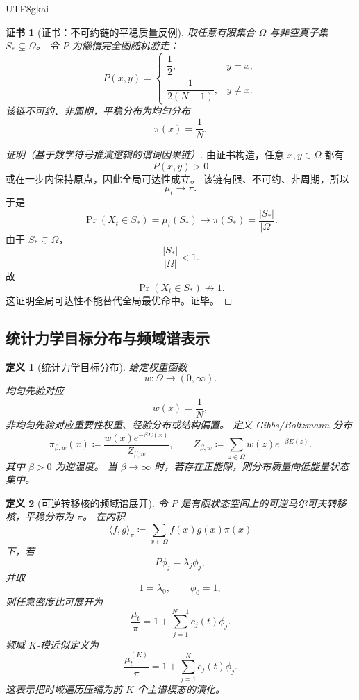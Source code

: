 \documentclass[12pt]{article}
\newtheorem{definition}{定义}[section]
\newtheorem{Certificate}{证书}[section]
\newcommand{\DefEq}{\coloneqq}
\begin{document}
\begin{CJK*}{UTF8}{gkai}
\begin{Certificate}[证书：不可约链的平稳质量反例]
\label{cert:tex55-reachable-not-hit}
取任意有限集合 \(\Omega\) 与非空真子集 \(S_*\subsetneq\Omega\)。
令 \(P\) 为懒惰完全图随机游走：
\[
  P(x,y)=
  \begin{cases}
    \dfrac12, & y=x,\\[0.6em]
    \dfrac{1}{2(N-1)}, & y\ne x.
  \end{cases}
\]
该链不可约、非周期，平稳分布为均匀分布
\[
  \pi(x)=\frac1N.
\]
\end{Certificate}

\begin{proof}[证明（基于数学符号推演逻辑的谓词因果链）]
由证书构造，任意 \(x,y\in\Omega\) 都有
\[
  P(x,y)>0
\]
或在一步内保持原点，因此全局可达性成立。
该链有限、不可约、非周期，所以
\[
  \mu_t\to\pi.
\]
于是
\[
  \Pr(X_t\in S_*)=\mu_t(S_*)\to\pi(S_*)=\frac{|S_*|}{|\Omega|}.
\]
由于 \(S_*\subsetneq\Omega\)，
\[
  \frac{|S_*|}{|\Omega|}<1.
\]
故
\[
  \Pr(X_t\in S_*)\not\to1.
\]
这证明全局可达性不能替代全局最优命中。证毕。
\end{proof}

\subsection{统计力学目标分布与频域谱表示}
\label{subsec:tex55-gibbs-spectrum}

\begin{definition}[统计力学目标分布]
\label{def:tex55-gibbs}
给定权重函数
\[
  w:\Omega\to(0,\infty).
\]
均匀先验对应
\[
  w(x)=\frac1N,
\]
非均匀先验对应重要性权重、经验分布或结构偏置。
定义 Gibbs/Boltzmann 分布
\[
  \pi_{\beta,w}(x)
  \DefEq
  \frac{w(x)e^{-\beta E(x)}}{Z_{\beta,w}},
  \qquad
  Z_{\beta,w}\DefEq\sum_{z\in\Omega}w(z)e^{-\beta E(z)}.
\]
其中 \(\beta>0\) 为逆温度。
当 \(\beta\to\infty\) 时，若存在正能隙，则分布质量向低能量状态集中。
\end{definition}

\begin{definition}[可逆转移核的频域谱展开]
\label{def:tex55-spectral}
令 \(P\) 是有限状态空间上的可逆马尔可夫转移核，平稳分布为 \(\pi\)。
在内积
\[
  \langle f,g\rangle_{\pi}
  \DefEq
  \sum_{x\in\Omega}f(x)g(x)\pi(x)
\]
下，若
\[
  P\phi_j=\lambda_j\phi_j,
\]
并取
\[
  1=\lambda_0,
  \qquad
  \phi_0=1,
\]
则任意密度比可展开为
\[
  \frac{\mu_t}{\pi}
  =
  1+\sum_{j=1}^{N-1}c_j(t)\phi_j.
\]
频域 \(K\)-模近似定义为
\[
  \frac{\mu_t^{(K)}}{\pi}
  =
  1+\sum_{j=1}^{K}c_j(t)\phi_j.
\]
这表示把时域遍历压缩为前 \(K\) 个主谱模态的演化。
\end{definition}


\end{CJK*}
\end{document}
